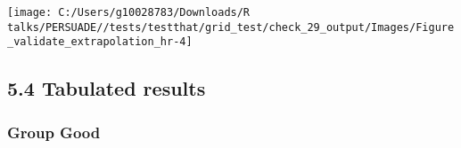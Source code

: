 \documentclass[
]{article}
\begin{document}
\begin{flushleft}\texttt{[image: C:/Users/g10028783/Downloads/R talks/PERSUADE//tests/testthat/grid\_test/check\_29\_output/Images/Figure\_validate\_extrapolation\_hr-4]} \end{flushleft}

\clearpage

\subsection{5.4 Tabulated results}\label{tabulated-results}

\subsubsection{Group Good}\label{group-good}
\end{document}
